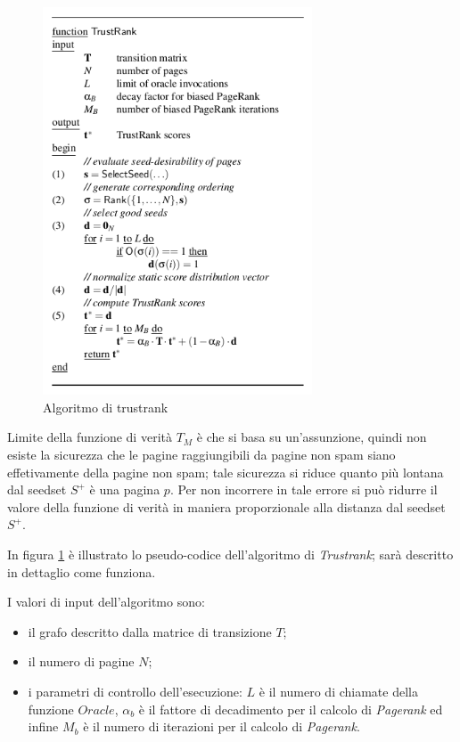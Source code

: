 \begin{figure}
\centering
\includegraphics[width=8cm]{immagini/trustrank/trustrank}
\caption{Algoritmo di trustrank}
\label{fig:trustrank1}
\end{figure}
Limite della funzione di verità \(T_M\) è che si basa su un'assunzione, quindi non esiste la sicurezza che le pagine raggiungibili da pagine non spam siano effetivamente della pagine non spam; tale sicurezza si riduce quanto più lontana dal seedset \(S^+\) è una pagina \(p\). Per non incorrere in tale errore si può ridurre il valore della funzione di verità in maniera proporzionale alla distanza dal seedset \(S^+\).

In figura \ref{fig:trustrank1} è illustrato lo pseudo-codice dell'algoritmo di \textit{Trustrank}; sarà descritto in dettaglio come funziona. 

I valori di input dell'algoritmo sono:
\begin{itemize}
 \item il grafo descritto dalla matrice di transizione \(T\);
 \item il numero di pagine \(N\);
 \item i parametri di controllo dell'esecuzione: \(L\) è il numero di chiamate della funzione \(Oracle\), \(\alpha_b\) è il fattore di decadimento per il calcolo di \textit{Pagerank} ed infine \(M_b\) è il numero di iterazioni per il calcolo di \textit{Pagerank}.
\end{itemize}

